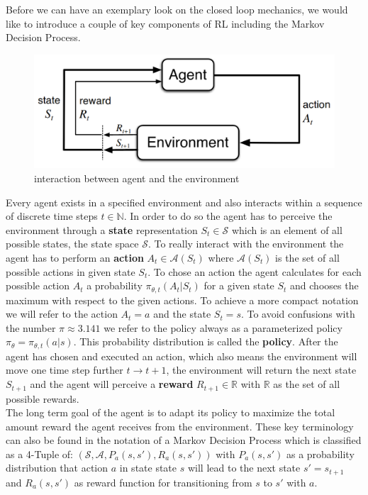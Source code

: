 Before we can have an exemplary look on the closed loop mechanics, we would like to introduce a couple of key components of RL including the Markov Decision Process.

% 
\begin{figure}
	\centering
    \includegraphics[width=\linewidth,]{figures/background/agent-environment-interaction.png}
	\caption{interaction between agent and the environment}
	\label{fig:agent-environment_interaction}
	\endminipage
\end{figure}


Every agent exists in a specified environment and also interacts within a sequence of discrete time steps $t \in \mathbb{N}$. In order to do so the agent has to perceive the environment through a \textbf{state} representation $S_t \in \mathcal{S}$ which is an element of all possible states, the state space $\mathcal{S}$. To really interact with the environment the agent has to perform an \textbf{action} $A_t \in \mathcal{A}(S_t)$ where $\mathcal{A}(S_t)$ is the set of all possible actions in given state $S_t$. To chose an action the agent calculates for each possible action $A_t$ a probability $\pi_{\theta, t}(A_t|S_t)$ for a given state $S_t$ and chooses the maximum with respect to the given actions. To achieve a more compact notation we will refer to the action $A_t = a$ and the state $S_t = s$. To avoid confusions with the number $\pi \approx 3.141$ we refer to the policy always as a parameterized policy $\pi_\theta = \pi_{\theta, t}(a|s)$.  
This probability distribution is called the \textbf{policy}. 
After the agent has chosen and executed an action, which also means the environment will move one time step further $t \to t + 1$, the environment will return the next state $S_{t+1}$ and the agent will perceive a \textbf{reward} $R_{t+1} \in \mathbb{R}$ with $\mathbb{R}$ as the set of all possible rewards.\\
The long term goal of the agent is to adapt its policy to maximize the total amount reward the agent receives from the environment.
These key terminology can also be found in the notation of a Markov Decision Process which is classified as a 4-Tuple of: $(\mathcal{S}, \mathcal{A}, P_a(s, s'), R_a(s, s'))$ with $ P_a(s, s')$ as a probability distribution that action $a$ in state state $s$ will lead to the next state $s' = s_{t+1}$ and $ R_a(s, s')$ as reward function for transitioning from $s$ to $s'$ with $a$.

